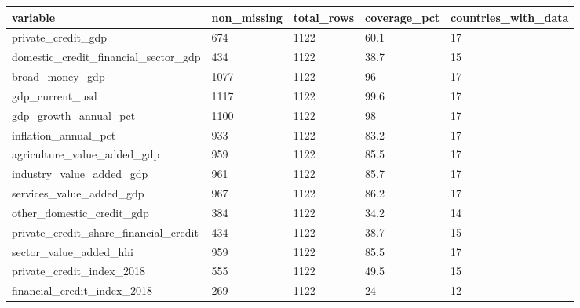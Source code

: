 ﻿%
\begin{tabular}{lllll}
\hline
variable & non_missing & total_rows & coverage_pct & countries_with_data \\
\hline
private\_credit\_gdp & 674 & 1122 & 60.1 & 17 \\
domestic\_credit\_financial\_sector\_gdp & 434 & 1122 & 38.7 & 15 \\
broad\_money\_gdp & 1077 & 1122 & 96 & 17 \\
gdp\_current\_usd & 1117 & 1122 & 99.6 & 17 \\
gdp\_growth\_annual\_pct & 1100 & 1122 & 98 & 17 \\
inflation\_annual\_pct & 933 & 1122 & 83.2 & 17 \\
agriculture\_value\_added\_gdp & 959 & 1122 & 85.5 & 17 \\
industry\_value\_added\_gdp & 961 & 1122 & 85.7 & 17 \\
services\_value\_added\_gdp & 967 & 1122 & 86.2 & 17 \\
other\_domestic\_credit\_gdp & 384 & 1122 & 34.2 & 14 \\
private\_credit\_share\_financial\_credit & 434 & 1122 & 38.7 & 15 \\
sector\_value\_added\_hhi & 959 & 1122 & 85.5 & 17 \\
private\_credit\_index\_2018 & 555 & 1122 & 49.5 & 15 \\
financial\_credit\_index\_2018 & 269 & 1122 & 24 & 12 \\
\hline
\end{tabular}

